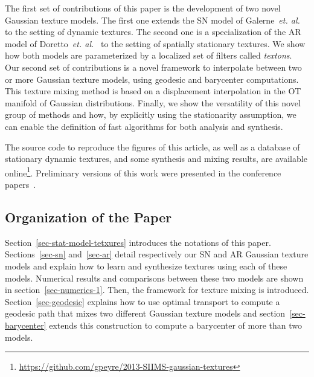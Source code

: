 The first set of contributions of this paper is the development of two novel Gaussian texture models. The first one extends the SN model of Galerne~\emph{et. al.}~\cite{galerne-ieee} to the setting of dynamic textures. The second one is a specialization of the AR model of Doretto~\emph{et. al.}~\cite{doretto-ijcv} to the setting of spatially stationary textures. We show how both models are parameterized by a localized set of filters called \emph{textons}. Our second set of contributions is a novel framework to interpolate between two or more Gaussian texture models, using geodesic and barycenter computations. This texture mixing method is based on a displacement interpolation in the OT manifold of Gaussian distributions. Finally, we show the versatility of this novel group of methods and how, by explicitly using the stationarity assumption, we can enable the definition of fast algorithms for both analysis and synthesis. 

The source code to reproduce the figures of this article, as well as a database of stationary dynamic textures, and some synthesis and mixing results, are available online\footnote{\url{https://github.com/gpeyre/2013-SIIMS-gaussian-textures}}. Preliminary versions of this work were presented in the conference papers~\cite{2012-icip-dyntex,2013-ssvm-mixing}.


\subsection{Organization of the Paper}

Section~\ref{sec-stat-model-tetxures} introduces the notations of this paper. Sections~\ref{sec-sn} and~\ref{sec-ar} detail respectively our SN and AR Gaussian texture models and explain how to learn and synthesize textures using each of these models.
Numerical results and comparisons between these two models are shown in section~\ref{sec-numerics-1}. Then, the framework for texture mixing is introduced. Section~\ref{sec-geodesic} explains how to use optimal transport to compute a geodesic path that mixes two different Gaussian texture models and section~\ref{sec-barycenter} extends this construction to compute a barycenter of more than two models.
